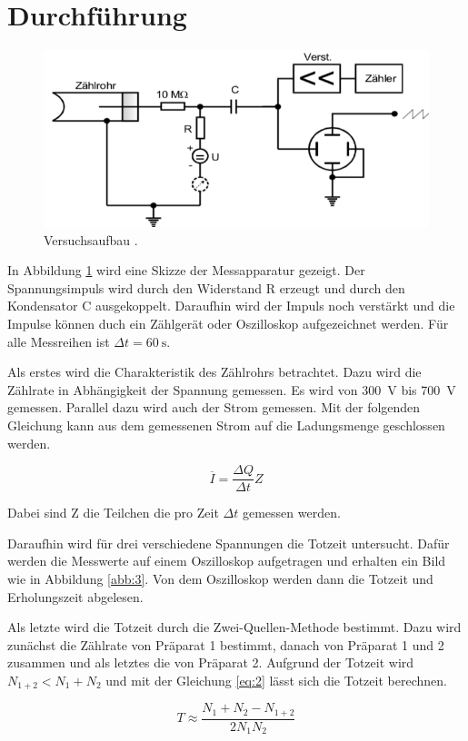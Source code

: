 \section{Durchführung}

\begin{figure}[H]
  \centering
  \includegraphics[width=\textwidth]{content/Aufbau.png}
  \caption{Versuchsaufbau \cite{1}.}
  \label{abb:5}
\end{figure}

In Abbildung \ref{abb:5} wird eine Skizze der Messapparatur gezeigt. Der Spannungsimpuls
wird durch den Widerstand R erzeugt und durch den Kondensator C ausgekoppelt. Daraufhin
wird der Impuls noch verstärkt und die Impulse können duch ein Zählgerät oder Oszilloskop
aufgezeichnet werden. Für alle Messreihen ist $\Delta t = \SI{60}{\second}$.

Als erstes wird die Charakteristik des Zählrohrs betrachtet. Dazu wird die Zählrate
in Abhängigkeit der Spannung gemessen. Es wird von \SI{300}{\volt} bis \SI{700}{\volt} gemessen.
Parallel dazu wird auch der Strom gemessen. Mit der folgenden Gleichung kann aus
dem gemessenen Strom auf die Ladungsmenge geschlossen werden.

\begin{equation}
  \overline{I} = \frac{\Delta Q}{\Delta t} Z
  \label{eq:1}
\end{equation}

Dabei sind Z die Teilchen die pro Zeit $\Delta t$ gemessen werden.

Daraufhin wird für drei verschiedene Spannungen die Totzeit untersucht. Dafür
werden die Messwerte auf einem Oszilloskop aufgetragen und erhalten ein Bild wie
in Abbildung \ref{abb:3}. Von dem Oszilloskop werden dann die Totzeit und Erholungszeit
abgelesen.

Als letzte wird die Totzeit durch die Zwei-Quellen-Methode bestimmt. Dazu wird zunächst
die Zählrate von Präparat 1 bestimmt, danach von Präparat 1 und 2 zusammen und als letztes
die von Präparat 2. Aufgrund der Totzeit wird $N_{1+2} < N_1 + N_2$ und mit der
Gleichung \ref{eq:2} lässt sich die Totzeit berechnen.

\begin{equation}
  T \approx \frac{N_1 + N_2 - N_{1+2}}{2 N_1 N_2}
  \label{eq:2}
\end{equation}
